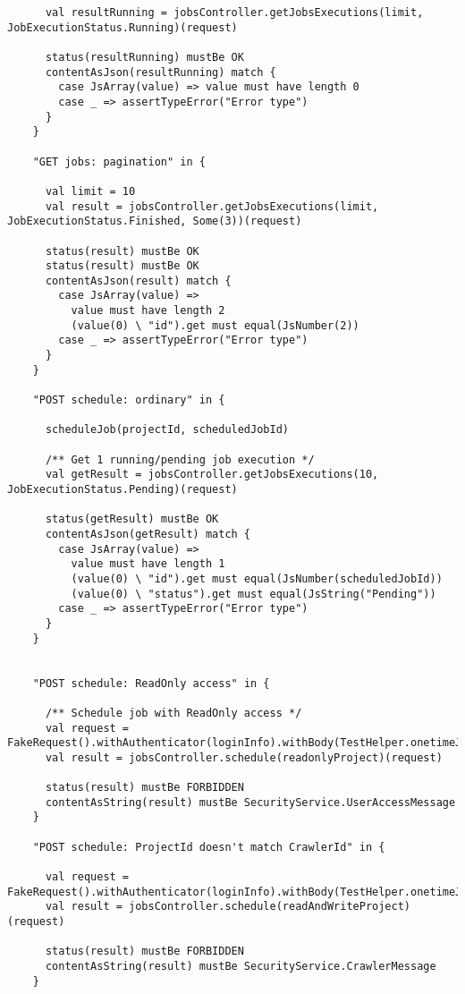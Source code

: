 \begin{lstlisting}
      val resultRunning = jobsController.getJobsExecutions(limit, JobExecutionStatus.Running)(request)

      status(resultRunning) mustBe OK
      contentAsJson(resultRunning) match {
        case JsArray(value) => value must have length 0
        case _ => assertTypeError("Error type")
      }
    }

    "GET jobs: pagination" in {

      val limit = 10
      val result = jobsController.getJobsExecutions(limit, JobExecutionStatus.Finished, Some(3))(request)

      status(result) mustBe OK
      status(result) mustBe OK
      contentAsJson(result) match {
        case JsArray(value) =>
          value must have length 2
          (value(0) \ "id").get must equal(JsNumber(2))
        case _ => assertTypeError("Error type")
      }
    }

    "POST schedule: ordinary" in {

      scheduleJob(projectId, scheduledJobId)

      /** Get 1 running/pending job execution */
      val getResult = jobsController.getJobsExecutions(10, JobExecutionStatus.Pending)(request)

      status(getResult) mustBe OK
      contentAsJson(getResult) match {
        case JsArray(value) =>
          value must have length 1
          (value(0) \ "id").get must equal(JsNumber(scheduledJobId))
          (value(0) \ "status").get must equal(JsString("Pending"))
        case _ => assertTypeError("Error type")
      }
    }


    "POST schedule: ReadOnly access" in {

      /** Schedule job with ReadOnly access */
      val request = FakeRequest().withAuthenticator(loginInfo).withBody(TestHelper.onetimeJobForm)
      val result = jobsController.schedule(readonlyProject)(request)

      status(result) mustBe FORBIDDEN
      contentAsString(result) mustBe SecurityService.UserAccessMessage
    }

    "POST schedule: ProjectId doesn't match CrawlerId" in {

      val request = FakeRequest().withAuthenticator(loginInfo).withBody(TestHelper.onetimeJobForm)
      val result = jobsController.schedule(readAndWriteProject)(request)

      status(result) mustBe FORBIDDEN
      contentAsString(result) mustBe SecurityService.CrawlerMessage
    }


\end{lstlisting}
